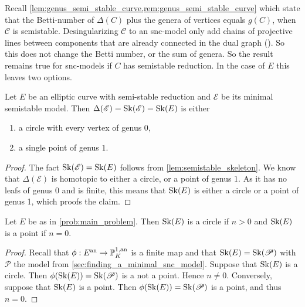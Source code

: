 Recall \cref{lem:genus_semi_stable_curve,rem:genus_semi_stable_curve} which state that the Betti-number of $\Delta(C)$ plus the genera of vertices equals $g(C)$, when $\mathscr C$ is semistable.  
Desingularizing $\mathscr C$ to an snc-model only add chains of projective lines between components that are already connected in the dual graph (\cite[cor.\ 10.3.25]{liuAlgebraicGeometryArithmetic2002}). 
So this does not change the Betti number, or the sum of genera. 
So the result remains true for snc-models if $C$ has semistable reduction. 
In the case of $E$ this leaves two options. 
\begin{lemma}\label{lem:point_or_circle}
	Let $E$ be an elliptic curve with semi-stable reduction and $\mathscr E$ be its minimal semistable model. 
	Then $\Delta(\mathscr E) = \operatorname{Sk}(\mathscr E) = \operatorname{Sk}(E)$ is either 
	\begin{enumerate}
		\item a circle with every vertex of genus $0$,
		\item a single point of genus  $1$. 
	\end{enumerate}
\end{lemma}
\begin{proof}
	The fact $\operatorname{Sk}(\mathscr E) = \operatorname{Sk}(E)$ follows from \cref{lem:semistable_skeleton}. 
	We know that $\Delta(\mathscr E)$ is homotopic to either a circle, or a point of genus $1$. 
	As it has no leafs of genus $0$ and is finite, this means that $\operatorname{Sk}(E)$ is either a circle or a point of genus 1, which proofs the claim.
\end{proof}

\begin{lemma}
	Let $E$ be as in \cref{prob:main_problem}. 
	Then $\operatorname{Sk}(E)$ is a circle if $n > 0$ and $\operatorname{Sk}(E)$ is a point if $n = 0$. 
\end{lemma}
\begin{proof}
	Recall that $\phi: E\an \to \pro^{1, \text{an}}_K$ is a finite map and that $\operatorname{Sk}(E) = \operatorname{Sk}(\mathscr P)$ with $\mathscr P$ the model from \cref{sec:finding_a_minimal_snc_model}.
	Suppose that $\operatorname{Sk}(E)$ is a circle. 
	Then $\phi(\sk(E))= \sk(\mathscr P)$ is a not a point. 
	Hence $n \ne 0$. 
	Conversely, suppose that $\operatorname{Sk}(E)$ is a point. 
	Then $\phi(\sk(E)) = \sk(\mathscr P)$ is a point, and thus $n  = 0$. 
\end{proof}

